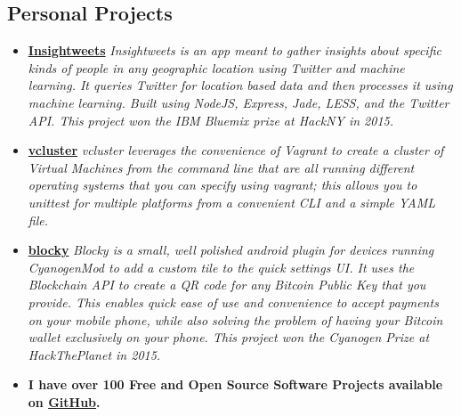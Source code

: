 \documentclass[12pt,a4paper,sans]{moderncv} %
\begin{document}
\vspace{10pt}


\subsection{Personal Projects}

\vspace{5pt}

\begin{itemize}

\item{\textbf{\href{http://insightweets.mybluemix.net/landing}{Insightweets}}\textit{ Insightweets is an app meant to gather insights about specific kinds of people in any geographic location using Twitter and machine learning. It queries Twitter for location based data and then processes it using machine learning. Built using NodeJS, Express, Jade, LESS, and the Twitter API. This project won the IBM Bluemix prize at HackNY in 2015.}}

\vspace{5pt}

\item{\textbf{\href{https://github.com/davidawad/vcluster}{vcluster}}\textit{ vcluster leverages the convenience of Vagrant to create a cluster of Virtual Machines from the command line that are all running different operating systems that you can specify using vagrant; this allows you to unittest for multiple platforms from a convenient CLI and a simple YAML file.}}

\vspace{5pt}

\item{\textbf{\href{http://github.com/davidawad/blocky}{blocky}} \textit{ Blocky is a small, well polished android plugin for devices running CyanogenMod to add a custom tile to the quick settings UI. It uses the Blockchain API to create a QR code for any Bitcoin Public Key that you provide. This enables quick ease of use and convenience to accept payments on your mobile phone, while also solving the problem of having your Bitcoin wallet exclusively on your phone. This project won the Cyanogen Prize at HackThePlanet in 2015.}}


\vspace{5pt}

\item{\textbf{I have over 100 Free and Open Source Software Projects available on \href{https://github.com/davidawad}{GitHub}.}}

\vspace{5pt}

\end{itemize}
\end{document}
